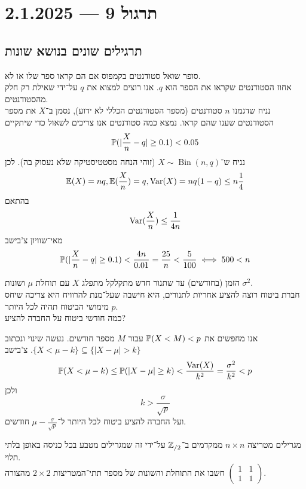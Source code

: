 \section{תרגול 9 --- 2.1.2025}
\subsection{תרגילים שונים בנושא שונות}
\begin{example}
	סופר שואל סטודנטים בקמפוס אם הם קראו ספר שלו או לא. \\
	אחוז הסטודנטים שקראו את הספר הוא $q$.
	אנו רוצים למצוא את $q$ על־ידי שאילת רק חלק מהסטודנטים. \\
	נניח שדגמנו $n$ סטודנטים (מספר הסטודנטים הכללי לא ידוע), נסמן ב־$X$ את מספר הסטודנטים שענו שהם קראו.
	נמצא כמה סטודנטים אנו צריכים לשאול כדי שיתקיים
	\[
		\mathbb{P}(| \frac{X}{n} - q| \ge 0.1) < 0.05
	\]
	נניח ש־$X \sim \operatorname{Bin}(n, q)$ (זוהי הנחה מסטטיסטיקה שלא נעסוק בה).
	לכן
	\[
		\mathbb{E}(X) = nq,
		\mathbb{E}(\frac{X}{n}) = q,
		\operatorname{Var}(X) = nq(1 - q) \le n \frac{1}{4}
	\]
	בהתאם
	\[
		\operatorname{Var}(\frac{X}{n}) \le \frac{1}{4n}
	\]
	מאי־שוויון צ'בישב
	\[
		\mathbb{P}(|\frac{X}{n} - q| \ge 0.1) <\frac{4n}{0.01} = \frac{25}{n} < \frac{5}{100}
		\iff 500 < n
	\]
\end{example}
\begin{exercise}
	הזמן (בחודשים) עד שתנור חדש מתקלקל מתפלג $X$ עם תוחלת $\mu$ ושונות $\sigma^2$. \\
	חברת ביטוח רוצה להציע אחריות לתנורים, היא חישבה שעל־מנת להרוויח היא צריכה שיחס מימושי הביטוח תהיה לכל היותר $p$. \\
	כמה חודשי ביטוח על החברה להציע?
\end{exercise}
\begin{solution}
	אנו מחפשים את $\mathbb{P}(X < M) < p$ עבור $M$ מספר חודשים. נעשה שינוי ונכתוב $\{X < \mu - k\} \subseteq \{ |X - \mu| > k \}$.
	צ'בישב
	\[
		\mathbb{P}(X < \mu - k)
		\le \mathbb{P}(|X - \mu| \ge k)
		< \frac{\operatorname{Var}(X)}{k^2}
		= \frac{\sigma^2}{k^2}
		< p
	\]
	ולכן
	\[
		k > \frac{\sigma}{\sqrt{p}}
	\]
	ועל החברה להציע ביטוח לכל היותר ל־$\mu - \frac{\sigma}{\sqrt{p}}$ חודשים.
\end{solution}
\begin{exercise}
	מגרילים מטריצה $n \times n$ ממקדמים ב־$\mathbb{Z}_{/2}$ על־ידי זה שמגרילים מטבע בכל כניסה באופן בלתי תלוי. \\
	חשבו את התוחלת והשונות של מספר תתי־המטריצות $2 \times 2$ מהצורה $\begin{pmatrix} 1 & 1 \\ 1 & 1 \end{pmatrix}$.
\end{exercise}
